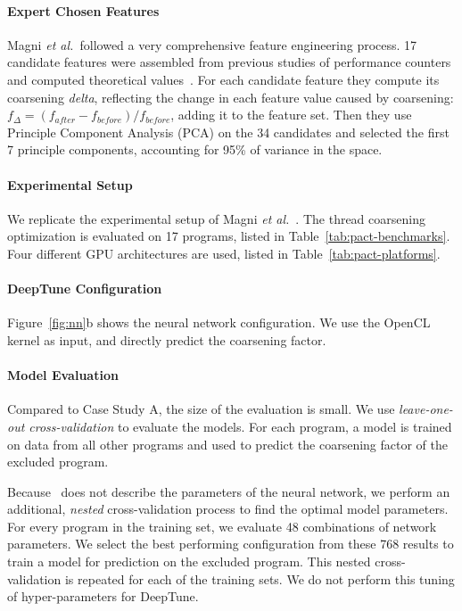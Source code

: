 

\paragraph{Expert Chosen Features} Magni \emph{et al.\ }followed a very comprehensive feature engineering process. 17 candidate features were assembled from previous studies of performance counters and computed theoretical values~\cite{Magni2,Sim2012}. For each candidate feature they compute its coarsening \emph{delta}, reflecting the change in each feature value caused by coarsening: $f_{\Delta} = (f_{after} - f_{before}) / f_{before}$, adding it to the feature set. Then they use Principle Component Analysis (PCA) on the 34 candidates and selected the first 7 principle components, accounting for 95\% of variance in the space.

\paragraph{Experimental Setup} We replicate the experimental setup of Magni \emph{et al.}~\cite{Magni2014}. The thread coarsening optimization is evaluated on 17 programs, listed in Table~\ref{tab:pact-benchmarks}. Four different GPU architectures are used, listed in Table~\ref{tab:pact-platforms}.

\paragraph{DeepTune Configuration} Figure~\ref{fig:nn}b shows the neural network configuration. We use the OpenCL kernel as input, and directly predict the coarsening factor.

\paragraph{Model Evaluation} Compared to Case Study A, the size of the evaluation is small. We use \emph{leave-one-out cross-validation} to evaluate the models. For each program, a model is trained on data from all other programs and used to predict the coarsening factor of the excluded program.

Because~\cite{Magni2014} does not describe the parameters of the neural network, we perform an additional, \emph{nested} cross-validation process to find the optimal model parameters. For every program in the training set, we evaluate 48 combinations of network parameters. We select the best performing configuration from these 768 results to train a model for prediction on the excluded program. This nested cross-validation is repeated for each of the training sets. We do not perform this tuning of hyper-parameters for DeepTune.


